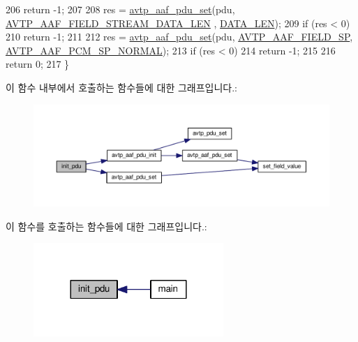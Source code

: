 \begin{DoxyCode}
206         \textcolor{keywordflow}{return} -1;
207 
208     res = \hyperlink{avtp__aaf_8h_af242dc7ed6c5ca5ea8e9d5071c13e19d}{avtp\_aaf\_pdu\_set}(pdu, \hyperlink{avtp__aaf_8h_a7eaee6c1ebc806c0401dbe7b14cd22dba0adf28243896ab6183e2558b52b1cae5}{AVTP\_AAF\_FIELD\_STREAM\_DATA\_LEN}
      , \hyperlink{aaf-talker_8c_af02e45f15080b8ec9dd7b286157617ff}{DATA\_LEN});
209     \textcolor{keywordflow}{if} (res < 0)
210         \textcolor{keywordflow}{return} -1;
211 
212     res = \hyperlink{avtp__aaf_8h_af242dc7ed6c5ca5ea8e9d5071c13e19d}{avtp\_aaf\_pdu\_set}(pdu, \hyperlink{avtp__aaf_8h_a7eaee6c1ebc806c0401dbe7b14cd22dba79d34018cdf39cf46998df2bc16e7617}{AVTP\_AAF\_FIELD\_SP}, 
      \hyperlink{avtp__aaf_8h_a70d680c008a86c9899abf41a18e89a51}{AVTP\_AAF\_PCM\_SP\_NORMAL});
213     \textcolor{keywordflow}{if} (res < 0)
214         \textcolor{keywordflow}{return} -1;
215 
216     \textcolor{keywordflow}{return} 0;
217 \}
\end{DoxyCode}


이 함수 내부에서 호출하는 함수들에 대한 그래프입니다.\+:
\nopagebreak
\begin{figure}[H]
\begin{center}
\leavevmode
\includegraphics[width=350pt]{aaf-talker_8c_af259dd94b2af738f7d96b177c1ab8ce2_cgraph}
\end{center}
\end{figure}




이 함수를 호출하는 함수들에 대한 그래프입니다.\+:
\nopagebreak
\begin{figure}[H]
\begin{center}
\leavevmode
\includegraphics[width=204pt]{aaf-talker_8c_af259dd94b2af738f7d96b177c1ab8ce2_icgraph}
\end{center}
\end{figure}


